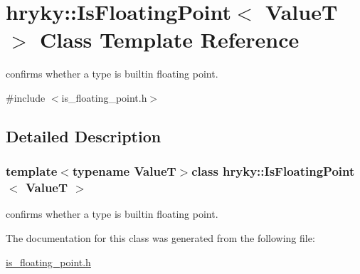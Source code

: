 \hypertarget{classhryky_1_1_is_floating_point}{\section{hryky\-:\-:Is\-Floating\-Point$<$ Value\-T $>$ Class Template Reference}
\label{classhryky_1_1_is_floating_point}
}


confirms whether a type is builtin floating point.  




{\ttfamily \#include $<$is\-\_\-floating\-\_\-point.\-h$>$}



\subsection{Detailed Description}
\subsubsection*{template$<$typename Value\-T$>$class hryky\-::\-Is\-Floating\-Point$<$ Value\-T $>$}

confirms whether a type is builtin floating point. 

The documentation for this class was generated from the following file\-:\begin{DoxyCompactItemize}
\item 
\hyperlink{is__floating__point_8h}{is\-\_\-floating\-\_\-point.\-h}\end{DoxyCompactItemize}
